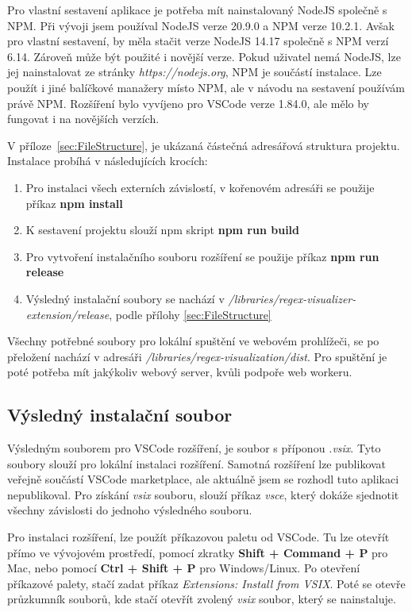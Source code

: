 Pro vlastní sestavení aplikace je potřeba mít nainstalovaný NodeJS společně s NPM.
Při vývoji jsem používal NodeJS verze 20.9.0 a NPM verze 10.2.1.
Avšak pro vlastní sestavení, by měla stačit verze NodeJS 14.17 společně s NPM verzí 6.14.
Zároveň může být použité i novější verze. 
Pokud uživatel nemá NodeJS, lze jej nainstalovat ze stránky \textit{https://nodejs.org}, NPM je součástí instalace.
Lze použít i jiné balíčkové manažery místo NPM, ale v návodu na sestavení používám právě NPM.
Rozšíření bylo vyvíjeno pro VSCode verze 1.84.0, ale mělo by fungovat i na novějších verzích.

V příloze~\ref{sec:FileStructure}, je ukázaná částečná adresářová struktura projektu.
Instalace probíhá v následujících krocích:

\begin{enumerate}
	\item Pro instalaci všech externích závislostí, v kořenovém adresáři se použije příkaz \textbf{\textcolor{OliveGreen}{npm install}}
	\item K sestavení projektu slouží npm skript \textbf{\textcolor{OliveGreen}{npm run build}}
	\item Pro vytvoření instalačního souboru rozšíření se použije příkaz \textbf{\textcolor{OliveGreen}{npm run release}}
	\item Výsledný instalační soubory se nachází v \textit{/libraries/regex-visualizer-extension/release}, podle přílohy \ref{sec:FileStructure}
\end{enumerate}

Všechny potřebné soubory pro lokální spuštění ve webovém prohlížeči, se po přeložení nachází v adresáři \textit{/libraries/regex-visualization/dist}. 
Pro spuštění je poté potřeba mít jakýkoliv webový server, kvůli podpoře web workeru.

\subsection*{Výsledný instalační soubor}

Výsledným souborem pro VSCode rozšíření, je soubor s příponou \textit{.vsix}.
Tyto soubory slouží pro lokální instalaci rozšíření. 
Samotná rozšíření lze publikovat veřejně součástí VSCode marketplace, ale aktuálně jsem se rozhodl tuto aplikaci nepublikoval.
Pro získání \textit{vsix} souboru, slouží příkaz \textit{vsce}, který dokáže sjednotit všechny závislosti do jednoho výsledného souboru.

Pro instalaci rozšíření, lze použít příkazovou paletu od VSCode.
Tu lze otevřít přímo ve vývojovém prostředí, pomocí zkratky \textbf{Shift + Command + P} pro Mac, nebo pomocí \textbf{Ctrl + Shift + P} pro Windows/Linux.
Po otevření příkazové palety, stačí zadat příkaz \textit{Extensions: Install from VSIX}.
Poté se otevře průzkumník souborů, kde stačí otevřít zvolený \textit{vsix} soubor, který se nainstaluje.

\endinput